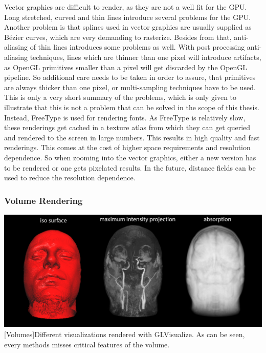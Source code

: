 Vector graphics are difficult to render, as they are not a well fit for the \ac{GPU}.
Long stretched, curved and thin lines introduce several problems for the GPU\cite{Liland565821}.
Another problem is that splines used in vector graphics are usually supplied as Bézier curves, which are very demanding to rasterize.
Besides from that, anti-aliasing of thin lines introduces some problems as well. With post processing anti-aliasing techniques, lines which are thinner than one pixel will introduce artifacts, as OpenGL primitives smaller than a pixel will get discarded by the \ac{OpenGL} pipeline. So additional care needs to be taken in order to assure, that primitives are always thicker than one pixel, or multi-sampling techniques have to be used.
This is only a very short summary of the problems, which is only given to illustrate that this is not a problem that can be solved in the scope of this thesis. 
Instead, FreeType\cite{FreeType} is used for rendering fonts. As FreeType is relatively slow, these renderings get cached in a texture atlas from which they can get queried and rendered to the screen in large numbers.
This results in high quality and fast renderings. This comes at the cost of higher space requirements and resolution dependence.
So when zooming into the vector graphics, either a new version has to be rendered or one gets pixelated results.
In the future, distance fields can be used to reduce the resolution dependence\cite{Green:2007:IAM:1281500.1281665}.

\subsubsection{Volume Rendering}
\vspace{1em}
\begin{minipage}{\linewidth}
    \centering
    \includegraphics[width=0.9\linewidth]{graphics/volumes.png}
    [Volumes]{Different visualizations rendered with GLVisualize. As can be seen, every methods misses critical features of the volume.}
    \label{fig:volumes}
\end{minipage}

